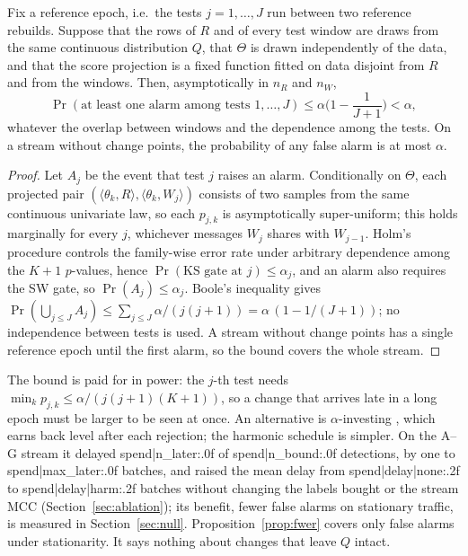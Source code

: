 \begin{proposition}\label{prop:fwer}
Fix a reference epoch, i.e.\ the tests $j=1,\dots,J$ run between two reference rebuilds. Suppose that the rows of $R$ and of every test window are draws from the same continuous distribution $Q$, that $\Theta$ is drawn independently of the data, and that the score projection is a fixed function fitted on data disjoint from $R$ and from the windows. Then, asymptotically in $n_R$ and $n_W$,
\[
\Pr(\text{at least one alarm among tests }1,\dots,J)\le\alpha\Big(1-\frac{1}{J+1}\Big)<\alpha ,
\]
whatever the overlap between windows and the dependence among the tests. On a stream without change points, the probability of any false alarm is at most $\alpha$.
\end{proposition}
\begin{proof}
Let $A_j$ be the event that test $j$ raises an alarm. Conditionally on $\Theta$, each projected pair $(\langle\theta_k,R\rangle,\langle\theta_k,W_j\rangle)$ consists of two samples from the same continuous univariate law, so each $p_{j,k}$ is asymptotically super-uniform; this holds marginally for every $j$, whichever messages $W_j$ shares with $W_{j-1}$. Holm's procedure controls the family-wise error rate under arbitrary dependence among the $K+1$ $p$-values, hence $\Pr(\text{KS gate at }j)\le\alpha_j$, and an alarm also requires the SW gate, so $\Pr(A_j)\le\alpha_j$. Boole's inequality gives $\Pr(\bigcup_{j\le J}A_j)\le\sum_{j\le J}\alpha/(j(j+1))=\alpha\,(1-1/(J+1))$; no independence between tests is used. A stream without change points has a single reference epoch until the first alarm, so the bound covers the whole stream.
\end{proof}

The bound is paid for in power: the $j$-th test needs $\min_k p_{j,k}\le\alpha/(j(j+1)(K+1))$, so a change that arrives late in a long epoch must be larger to be seen at once. An alternative is $\alpha$-investing \cite{foster2008}, which earns back level after each rejection; the harmonic schedule is simpler. On the A--G stream it delayed {{spend|n_later:.0f}} of {{spend|n_bound:.0f}} detections, by one to {{spend|max_later:.0f}} batches, and raised the mean delay from {{spend|delay|none:.2f}} to {{spend|delay|harm:.2f}} batches without changing the labels bought or the stream MCC (Section~\ref{sec:ablation}); its benefit, fewer false alarms on stationary traffic, is measured in Section~\ref{sec:null}. Proposition~\ref{prop:fwer} covers only false alarms under stationarity. It says nothing about changes that leave $Q$ intact.


